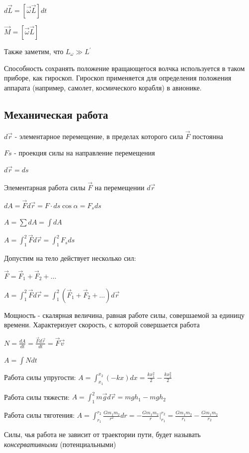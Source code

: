 \documentclass[12pt]{article}
\begin{document}
    $d\vec{L} = [\vec{\omega}\vec{L}]dt$

    $\vec{M} = [\vec{\omega}\vec{L}]$

    Также заметим, что $L_\omega \gg L^\prime$

    Способность сохранять положение вращающегося волчка используется в таком приборе, как гироскоп. 
    Гироскоп применяется для определения положения аппарата (например, самолет, космического корабля) в авионике.



    \subsection{Механическая работа}

    $d\vec{r}$ - элементарное перемещение, в пределах которого сила $\vec{F}$ постоянна

    $Fs$ - проекция силы на направление перемещения

    $d\vec{r} = ds$

    Элементарная работа силы $\vec{F}$ на перемещении $d\vec{r}$

    $dA = \vec{F} d\vec{r} = F\cdot ds \cos \alpha = F_s ds$

    $A = \sum dA = \int dA$

    $A = \int_1^2 \vec{F}d\vec{r} = \int_1^2 F_s ds$

    Допустим на тело действует несколько сил:

    $\vec{F} = \vec{F}_1 + \vec{F}_2 + \dots$

    $A = \int_1^2 \vec{F}d\vec{r} = \int_1^2 (\vec{F}_1 + \vec{F}_2 + \dots) d\vec{r}$

    Мощность - скалярная величина, равная работе силы, совершаемой за единицу времени. Характеризует скорость, с которой совершается работа

    $N = \frac{dA}{dt} = \frac{\vec{F}d\vec{r}}{dt} = \vec{F}\vec{v}$

    $A = \int Ndt$

    Работа силы упругости: $A = \int_{x_1}^{x_2} (-kx)dx = \frac{kx^2_1}{2} - \frac{kx_2^2}{2}$

    Работа силы тяжести: $A = \int_1^2 m\vec{g}d\vec{r} = mgh_1 - mgh_2$

    Работа силы тяготения: $A = \int_{r_1}^{r_2} \frac{Gm_1 m_2}{r^2} dr = - \frac{Gm_1 m_2}{r} \Big|_{r_1}^{r_2} = \frac{Gm_1 m_2}{r_1} - \frac{Gm_1 m_2}{r_2}$

    Силы, чья работа не зависит от траектории пути, будет называть \textit{консервативными} (потенциальными)
\end{document}
